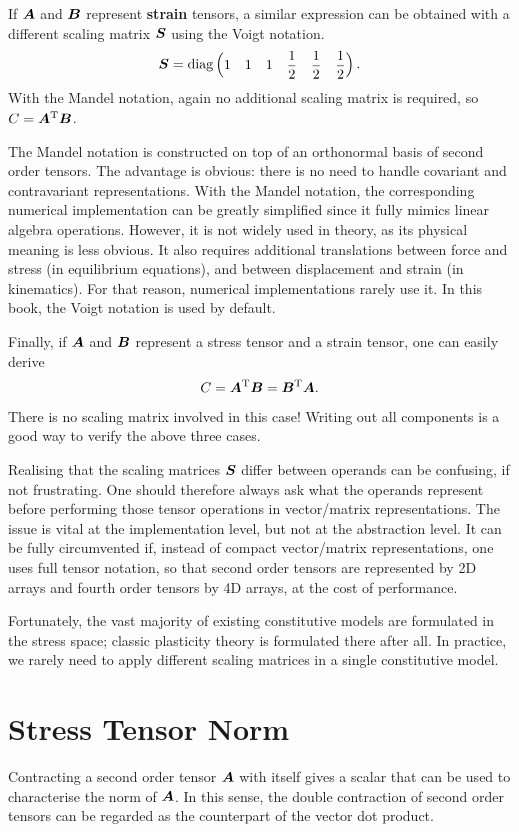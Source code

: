 If $\bm{A}$ and $\bm{B}$ represent \textbf{strain} tensors, a similar expression can be obtained with a different scaling matrix $\bm{S}$ using the Voigt notation.
\begin{gather}
\bm{S}=\text{diag}\left(
\begin{matrix}
1&1&1&\dfrac{1}{2}&\dfrac{1}{2}&\dfrac{1}{2}
\end{matrix}\right).
\end{gather}
With the Mandel notation, again no additional scaling matrix is required, so $C=\bm{A}^{\mathrm{T}}\bm{B}$.

The Mandel notation is constructed on top of an orthonormal basis of second order tensors.
The advantage is obvious: there is no need to handle covariant and contravariant representations.
With the Mandel notation, the corresponding numerical implementation can be greatly simplified since it fully mimics linear algebra operations.
However, it is not widely used in theory, as its physical meaning is less obvious.
It also requires additional translations between force and stress (in equilibrium equations), and between displacement and strain (in kinematics).
For that reason, numerical implementations rarely use it.
In this book, the Voigt notation is used by default.

Finally, if $\bm{A}$ and $\bm{B}$ represent a stress tensor and a strain tensor, one can easily derive
\begin{gather}
    C=\bm{A}^{\mathrm{T}}\bm{B}=\bm{B}^{\mathrm{T}}\bm{A}.
\end{gather}
There is no scaling matrix involved in this case!
Writing out all components is a good way to verify the above three cases.

Realising that the scaling matrices $\bm{S}$ differ between operands can be confusing, if not frustrating.
One should therefore always ask what the operands represent before performing those tensor operations in vector/matrix representations.
The issue is vital at the implementation level, but not at the abstraction level.
It can be fully circumvented if, instead of compact vector/matrix representations, one uses full tensor notation, so that second order tensors are represented by 2D arrays and fourth order tensors by 4D arrays, at the cost of performance.

Fortunately, the vast majority of existing constitutive models are formulated in the stress space; classic plasticity theory is formulated there after all.
In practice, we rarely need to apply different scaling matrices in a single constitutive model.
\section{Stress Tensor Norm}
Contracting a second order tensor $\bm{A}$ with itself gives a scalar that can be used to characterise the norm of $\bm{A}$.
In this sense, the double contraction of second order tensors can be regarded as the counterpart of the vector dot product.

